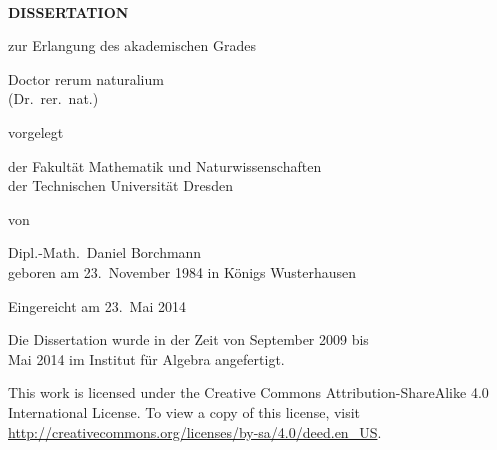 
~\cleardoublepage

\begin{center}
  \vfill{}

  \Huge\makeatletter{\textbf{\@title}}\makeatother

  \vfill{}

  \LARGE
  \textbf{D\;I\;S\;S\;E\;R\;T\;A\;T\;I\;O\;N}

  \vspace*{2ex}
  zur Erlangung des akademischen Grades
  \vspace*{2ex}

  Doctor rerum naturalium \\
  (Dr.\ rer.\ nat.)

  \vfill

  vorgelegt

  \vfill

  der Fakultät Mathematik und Naturwissenschaften\\
  der Technischen Universität Dresden

  \vfill

  von

  \vfill

  {\large
    Dipl.-Math.\ Daniel Borchmann\\
    \vspace*{.7ex}
    geboren am 23.\ November 1984 in Königs Wusterhausen
  }

  \vfill

  Eingereicht am 23.\, Mai 2014

  \vfill

  \large

  Die Dissertation wurde in der Zeit von September 2009 bis\\
  Mai 2014 im Institut für Algebra angefertigt.
\end{center}

\newpage

\vspace*{\fill}

\noindent%
This work is licensed under the Creative Commons Attribution-ShareAlike 4.0 International
License. To view a copy of this license, visit
\url{http://creativecommons.org/licenses/by-sa/4.0/deed.en_US}.

